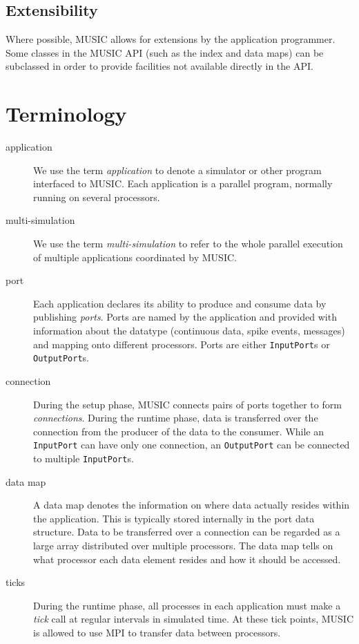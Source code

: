 \documentclass[a4paper,twoside]{report}
\begin{document}
\subsection{Extensibility}

Where possible, MUSIC allows for extensions by the application
programmer.  Some classes in the MUSIC API (such as the index and data
maps) can be subclassed in order to provide facilities not available
directly in the API.


\section{Terminology}

\begin{description}
\item[application] We use the term
  \emph{application} to denote a simulator or other
  program interfaced to MUSIC.  Each application is a parallel
  program, normally running on several processors.

\item[multi-simulation] We use the term
  \emph{multi-simulation} to refer to the
  whole parallel execution of multiple applications coordinated by
  MUSIC.

\item[port] Each application declares its ability to produce and
  consume data by publishing \emph{ports}.  Ports are
  named by the application and provided with information about the
  datatype (continuous data, spike events, messages) and mapping onto
  different processors.  Ports are either
  \lstinline|InputPort|s or
  \lstinline|OutputPort|s.

\item[connection] During the setup phase, MUSIC connects pairs of
  ports together to form \emph{connections}.  During
  the runtime phase, data is transferred over the connection from the
  producer of the data to the consumer.  While an
  \lstinline|InputPort| can have only one connection, an
  \lstinline|OutputPort| can be connected to multiple
  \lstinline|InputPort|s.
\pagebreak
\item[data map] A data map denotes the information on
  where data actually resides within the application.  This is
  typically stored internally in the port data structure.  Data to be
  transferred over a connection can be regarded as a large array
  distributed over multiple processors.  The data map tells on
  what processor each data element resides and how it should be
  accessed.

\item[ticks] During the runtime phase, all processes in each
  application must make a \emph{tick} call at regular
  intervals in simulated time.  At these tick points, MUSIC is allowed
  to use MPI to transfer data between processors.
\end{description}
\end{document}
